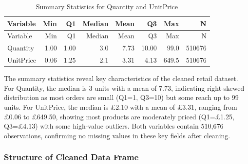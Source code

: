 \documentclass[
]{article}
\newenvironment{Shaded}{\begin{snugshade}}{\end{snugshade}}
\newcommand{\AttributeTok}[1]{\textcolor[rgb]{0.13,0.29,0.53}{#1}}
\newcommand{\ConstantTok}[1]{\textcolor[rgb]{0.56,0.35,0.01}{#1}}
\newcommand{\ControlFlowTok}[1]{\textcolor[rgb]{0.13,0.29,0.53}{\textbf{#1}}}
\newcommand{\DecValTok}[1]{\textcolor[rgb]{0.00,0.00,0.81}{#1}}
\newcommand{\FunctionTok}[1]{\textcolor[rgb]{0.13,0.29,0.53}{\textbf{#1}}}
\newcommand{\NormalTok}[1]{#1}
\newcommand{\SpecialCharTok}[1]{\textcolor[rgb]{0.81,0.36,0.00}{\textbf{#1}}}
\newcommand{\StringTok}[1]{\textcolor[rgb]{0.31,0.60,0.02}{#1}}
\begin{document}
\begin{Shaded}
\end{Shaded}

\begin{longtable}[]{@{}lrrrrrrr@{}}
\caption{Summary Statistics for Quantity and UnitPrice}\tabularnewline
\toprule\noalign{}
Variable & Min & Q1 & Median & Mean & Q3 & Max & N \\
\midrule\noalign{}
\endfirsthead
\toprule\noalign{}
Variable & Min & Q1 & Median & Mean & Q3 & Max & N \\
\midrule\noalign{}
\endhead
\bottomrule\noalign{}
\endlastfoot
Quantity & 1.00 & 1.00 & 3.0 & 7.73 & 10.00 & 99.0 & 510676 \\
UnitPrice & 0.06 & 1.25 & 2.1 & 3.31 & 4.13 & 649.5 & 510676 \\
\end{longtable}

The summary statistics reveal key characteristics of the cleaned retail
dataset. For Quantity, the median is 3 units with a mean of 7.73,
indicating right-skewed distribution as most orders are small (Q1=1,
Q3=10) but some reach up to 99 units. For UnitPrice, the median is £2.10
with a mean of £3.31, ranging from £0.06 to £649.50, showing most
products are moderately priced (Q1=£1.25, Q3=£4.13) with some high-value
outliers. Both variables contain 510,676 observations, confirming no
missing values in these key fields after cleaning.\newpage

\subsubsection{Structure of Cleaned Data
Frame}\label{structure-of-cleaned-data-frame}
\end{document}
